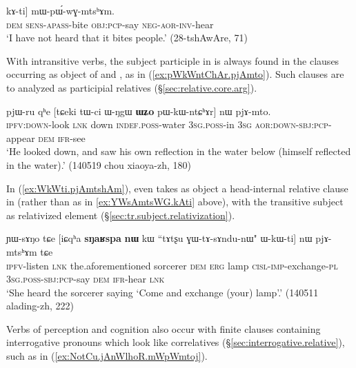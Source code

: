 \begin{exe}
\ex \label{ex:YWsAmtsWG.kAti}
 \gll [[nɯ ɲɯ-sɤ-mtsɯɣ] kɤ-ti] mɯ-pɯ́-wɣ-mtsʰɤm. \\
 \textsc{dem} \textsc{sens}-\textsc{apass}-bite \textsc{obj}:\textsc{pcp}-say \textsc{neg}-\textsc{aor}-\textsc{inv}-hear \\
 \glt `I have not heard   that it bites people.' (28-tshAwAre, 71)
\end{exe}
 
With intransitive verbs, the subject participle in  is always found in the clauses occurring as object of  and , as in (\ref{ex:pWkWntChAr.pjAmto}). Such clauses are to analyzed as participial relatives (§\ref{sec:relative.core.arg}).

\begin{exe}
\ex \label{ex:pWkWntChAr.pjAmto}
 \gll pjɯ-ru qʰe [tɕeki tɯ-ci ɯ-ŋgɯ \textbf{ɯʑo} pɯ-kɯ-ntɕʰɤr] nɯ pjɤ-mto. \\
 \textsc{ipfv}:\textsc{down}-look \textsc{lnk} down \textsc{indef}.\textsc{poss}-water \textsc{3sg}.\textsc{poss}-in \textsc{3sg} \textsc{aor}:\textsc{down}-\textsc{sbj}:\textsc{pcp}-appear \textsc{dem} \textsc{ifr}-see \\
 \glt  `He looked down, and saw his own reflection in the water below (himself reflected in the water).' (140519 chou xiaoya-zh, 180)
 \end{exe}
 
 In   (\ref{ex:WkWti.pjAmtshAm}),  even takes as object a head-internal relative clause in  (rather than  as in \ref{ex:YWsAmtsWG.kAti} above), with the transitive subject as relativized element (§\ref{sec:tr.subject.relativization}).
 
\begin{exe}
\ex \label{ex:WkWti.pjAmtshAm}
 \gll  ɲɯ-sɤŋo tɕe [iɕqʰa \textbf{sŋaʁspa} \textbf{nɯ} kɯ ``tɤtʂu ɣɯ-tɤ-sɤndu-nɯ" ɯ-kɯ-ti] nɯ pjɤ-mtsʰɤm tɕe \\
 \textsc{ipfv}-listen \textsc{lnk} the.aforementioned sorcerer \textsc{dem} \textsc{erg} lamp \textsc{cisl}-\textsc{imp}-exchange-\textsc{pl} \textsc{3sg}.\textsc{poss}-\textsc{sbj}:\textsc{pcp}-say \textsc{dem} \textsc{ifr}-hear \textsc{lnk} \\
 \glt `She heard the sorcerer saying `Come and exchange (your) lamp'.' (140511 alading-zh, 222)
 \end{exe}

Verbs of perception and cognition also occur with finite clauses containing interrogative pronouns which look like correlatives (§\ref{sec:interrogative.relative}), such as  in (\ref{ex:NotCu.jAnWlhoR.mWpWmtoj}).

